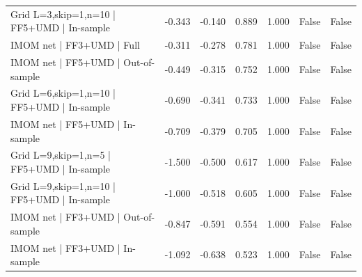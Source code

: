 \begin{tabular}{lrrrrrr}
Grid L=3,skip=1,n=10 | FF5+UMD | In-sample & -0.343 & -0.140 & 0.889 & 1.000 & False & False \\
IMOM net | FF3+UMD | Full & -0.311 & -0.278 & 0.781 & 1.000 & False & False \\
IMOM net | FF5+UMD | Out-of-sample & -0.449 & -0.315 & 0.752 & 1.000 & False & False \\
Grid L=6,skip=1,n=10 | FF5+UMD | In-sample & -0.690 & -0.341 & 0.733 & 1.000 & False & False \\
IMOM net | FF5+UMD | In-sample & -0.709 & -0.379 & 0.705 & 1.000 & False & False \\
Grid L=9,skip=1,n=5 | FF5+UMD | In-sample & -1.500 & -0.500 & 0.617 & 1.000 & False & False \\
Grid L=9,skip=1,n=10 | FF5+UMD | In-sample & -1.000 & -0.518 & 0.605 & 1.000 & False & False \\
IMOM net | FF3+UMD | Out-of-sample & -0.847 & -0.591 & 0.554 & 1.000 & False & False \\
IMOM net | FF3+UMD | In-sample & -1.092 & -0.638 & 0.523 & 1.000 & False & False \\
\bottomrule
\end{tabular}
